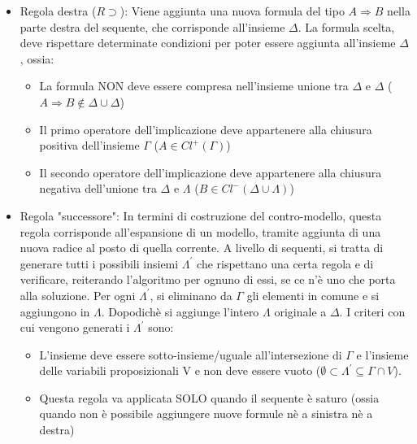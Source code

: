 \documentclass[\main/tesi.tex]{subfiles}
\begin{document}
\begin{itemize}
\begin{itemize}
\begin{itemize}
                    \end{itemize}
              \item Regola destra ($R\supset$): Viene aggiunta una nuova formula del tipo $A \Rightarrow B$ nella parte destra del sequente, che corrisponde all'insieme $\Delta$. La formula scelta, deve rispettare determinate condizioni per poter essere aggiunta all'insieme $\Delta$, ossia:
                    \begin{itemize}
                        \item La formula NON deve essere compresa nell'insieme unione tra $\Delta$ e $\Delta$ ($A \Rightarrow B \notin \Delta \cup \Delta$)
                        \item Il primo operatore dell'implicazione deve appartenere alla chiusura positiva dell'insieme $\Gamma$ ($A \in Cl^{+}(\Gamma)$)
                        \item Il secondo operatore dell'implicazione deve appartenere alla chiusura negativa dell'unione tra $\Delta$ e $\Lambda$ ($B \in Cl^{-}(\Delta \cup \Lambda)$)
                    \end{itemize}
              \item Regola "successore": In termini di costruzione del contro-modello, questa regola corrisponde all'espansione di un modello, tramite aggiunta di una nuova radice al posto di quella corrente. A livello di sequenti, si tratta di generare tutti i possibili insiemi $\Lambda^{'}$ che rispettano una certa regola e di verificare, reiterando l'algoritmo per ognuno di essi, se ce n'è uno che porta alla soluzione. Per ogni $\Lambda^{'}$, si eliminano da $\Gamma$ gli elementi in comune e si aggiungono in $\Lambda$. Dopodichè si aggiunge l'intero $\Lambda$ originale a $\Delta$. I criteri con cui vengono generati i $\Lambda^{'}$ sono:
                    \begin{itemize}
                        \item L'insieme deve essere sotto-insieme/uguale all'intersezione di $\Gamma$ e l'insieme delle variabili proposizionali V e non deve essere vuoto ($\emptyset \subset \Lambda^{'} \subseteq \Gamma \cap V$).
                        \item Questa regola va applicata SOLO quando il sequente è saturo (ossia quando non è possibile aggiungere nuove formule nè a sinistra nè a destra)
                    \end{itemize}
          \end{itemize}
\end{itemize}
\end{document}
